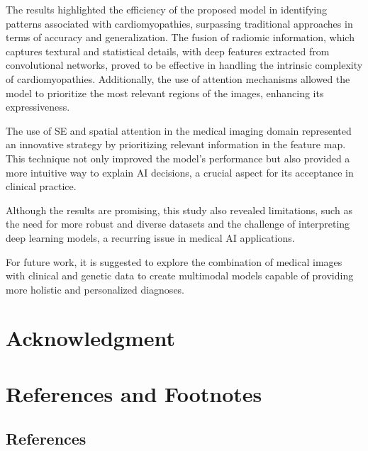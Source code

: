 \documentclass[journal,twoside,web]{ieeecolor}
\begin{document}
The results highlighted the efficiency of the proposed model in identifying patterns associated with cardiomyopathies, surpassing traditional approaches in terms of accuracy and generalization. The fusion of radiomic information, which captures textural and statistical details, with deep features extracted from convolutional networks, proved to be effective in handling the intrinsic complexity of cardiomyopathies. Additionally, the use of attention mechanisms allowed the model to prioritize the most relevant regions of the images, enhancing its expressiveness.  

The use of SE and spatial attention in the medical imaging domain represented an innovative strategy by prioritizing relevant information in the feature map. This technique not only improved the model’s performance but also provided a more intuitive way to explain AI decisions, a crucial aspect for its acceptance in clinical practice.  

Although the results are promising, this study also revealed limitations, such as the need for more robust and diverse datasets and the challenge of interpreting deep learning models, a recurring issue in medical AI applications. 


For future work, it is suggested to explore the combination of medical images with clinical and genetic data to create multimodal models capable of providing more holistic and personalized diagnoses. 


\appendices

\section*{Acknowledgment}

\lipsum[11-11]


\section*{References and Footnotes}
\subsection{References}
% 

% 


\end{document}
